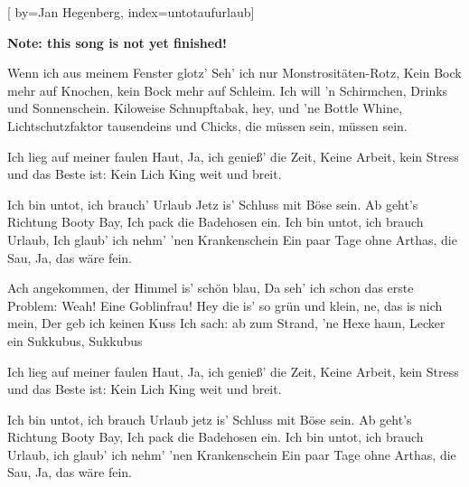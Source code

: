 

[%
    by={Jan Hegenberg},
    index={untotaufurlaub}]


    \label{untotaufurlaub}

    \textbf{Note: this song is not yet finished!}

    \beginverse
        Wenn ich aus meinem Fenster glotz'
        Seh' ich nur Monstrosit\"{a}ten-Rotz,
        Kein Bock mehr auf Knochen, kein Bock mehr auf Schleim.
        Ich will 'n Schirmchen, Drinks und Sonnenschein.
        Kiloweise Schnupftabak, hey, und 'ne Bottle Whine,
        Lichtschutzfaktor tausendeins und Chicks, die m\"{u}ssen sein, m\"{u}ssen sein.
    \endverse

    \beginverse*
        Ich lieg auf meiner faulen Haut,
        Ja, ich genie\ss{}' die Zeit,
        Keine Arbeit, kein Stress und das Beste ist:
        Kein Lich King weit und breit.
    \endverse

    \beginchorus
        Ich bin untot, ich brauch' Urlaub
        Jetz is' Schluss mit B\"{o}se sein.
        Ab geht's Richtung Booty Bay,
        Ich pack die Badehosen ein.
        Ich bin untot, ich brauch Urlaub,
        Ich glaub' ich nehm' 'nen Krankenschein
        Ein paar Tage ohne Arthas, die Sau,
        Ja, das w\"{a}re fein.
    \endchorus

    \beginverse
        Ach angekommen, der Himmel is' sch\"{o}n blau,
        Da seh' ich schon das erste Problem:
        Weah! Eine Goblinfrau!
        Hey die is' so gr\"{u}n und klein, ne, das is nich mein,
        Der geb ich keinen Kuss
        Ich sach: ab zum Strand, 'ne Hexe haun,
        Lecker ein Sukkubus, Sukkubus
    \endverse

    \beginverse*
        Ich lieg auf meiner faulen Haut,
        Ja, ich genie\ss{}' die Zeit,
        Keine Arbeit, kein Stress und das Beste ist:
        Kein Lich King weit und breit.
    \endverse

    \beginchorus
        Ich bin untot, ich brauch Urlaub
        jetz is' Schluss mit B\"{o}se sein.
        Ab geht's Richtung Booty Bay,
        Ich pack die Badehosen ein.
        Ich bin untot, ich brauch Urlaub,
        ich glaub' ich nehm' 'nen Krankenschein
        Ein paar Tage ohne Arthas, die Sau,
        Ja, das w\"{a}re fein.
    \endchorus

